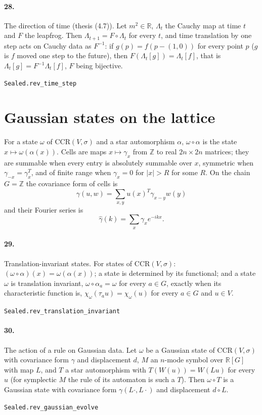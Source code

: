\documentclass[11pt]{article}
\begin{document}
\paragraph{28.} The direction of time (thesis (4.7)). Let $m^2 \in \mathbb R$, $\Lambda_t$ the Cauchy map at time $t$ and $F$ the leapfrog. Then $\Lambda_{t+1} = F \circ \Lambda_t$ for every $t$, and time translation by one step acts on Cauchy data as $F^{-1}$: if $g(p) = f(p - (1, 0))$ for every point $p$ ($g$ is $f$ moved one step to the future), then $F(\Lambda_t [g]) = \Lambda_t [f]$, that is $\Lambda_t [g] = F^{-1} \Lambda_t [f]$, $F$ being bijective.\par{\footnotesize\texttt{Sealed.rev\_time\_step}}

\section*{Gaussian states on the lattice}
For a state $\omega$ of $\mathrm{CCR}(V, \sigma)$ and a star automorphism $\alpha$, $\omega \circ \alpha$ is the state $x \mapsto \omega(\alpha(x))$. Cells are maps $x \mapsto \gamma_x$ from $\mathbb Z$ to real $2n \times 2n$ matrices; they are summable when every entry is absolutely summable over $x$, symmetric when $\gamma_{-x} = \gamma_x^T$, and of finite range when $\gamma_x = 0$ for $|x| > R$ for some $R$. On the chain $G = \mathbb Z$ the covariance form of cells is \[\gamma(u, w) = \sum_{x, y} u(x)^T \gamma_{x-y} w(y)\] and their Fourier series is \[\hat\gamma(k) = \sum_x \gamma_x e^{-ikx}.\]

\paragraph{29.} Translation-invariant states. For states of $\mathrm{CCR}(V, \sigma)$: $(\omega \circ \alpha)(x) = \omega(\alpha(x))$; a state is determined by its functional; and a state $\omega$ is translation invariant, $\omega \circ \alpha_a = \omega$ for every $a \in G$, exactly when its characteristic function is, $\chi_\omega(\tau_a u) = \chi_\omega(u)$ for every $a \in G$ and $u \in V$.\par{\footnotesize\texttt{Sealed.rev\_translation\_invariant}}

\paragraph{30.} The action of a rule on Gaussian data. Let $\omega$ be a Gaussian state of $\mathrm{CCR}(V, \sigma)$ with covariance form $\gamma$ and displacement $d$, $M$ an $n$-mode symbol over $\mathbb R[G]$ with map $L$, and $T$ a star automorphism with $T(W(u)) = W(L u)$ for every $u$ (for symplectic $M$ the rule of its automaton is such a $T$). Then $\omega \circ T$ is a Gaussian state with covariance form $\gamma(L \cdot, L \cdot)$ and displacement $d \circ L$.\par{\footnotesize\texttt{Sealed.rev\_gaussian\_evolve}}
\end{document}
